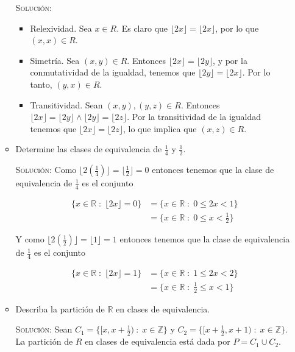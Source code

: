 \documentclass[letterpaper,11pt]{article}
\begin{document}
\begin{enumerate}
\begin{itemize}
        \textsc{Solución:}
        \begin{itemize}
            \item Relexividad. Sea $x \in R$. Es claro que $⌊2x⌋ = ⌊2x⌋$, 
            por lo que $(x, x) \in R$. 

            \item Simetría. Sea $(x, y) \in R$. Entonces $⌊2x⌋ = ⌊2y⌋$, y por 
            la conmutatividad de la igualdad, tenemos que $⌊2y⌋ = ⌊2x⌋$. Por
            lo tanto, $(y, x) \in R$. 

            \item Transitividad. Sean $(x, y), (y,z) \in R$. Entonces 
            $⌊2x⌋ = ⌊2y⌋ \land ⌊2y⌋ = ⌊2z⌋$. Por la transitividad de la 
            igualdad tenemos que $⌊2x⌋ = ⌊2z⌋$, lo que implica que 
            $(x, z) ∈ R$. 
        \end{itemize}

        \item Determine las clases de equivalencia de $\frac{1}{4}$ y 
        $\frac{1}{2}$.

        \textsc{Solución:} Como $⌊2(\frac{1}{4})⌋ = ⌊\frac{1}{2}⌋ = 0$ entonces 
        tenemos que la clase de equivalencia de $\frac{1}{4}$ es el conjunto 

        \begin{align*}
            \{ x ∈ ℝ \; : \; ⌊2x⌋ = 0\}
            &= \{x ∈ ℝ \; : \; 0 \leq 2x < 1\} \\ 
            &= \{x ∈ ℝ \; : \; 0 \leq x < \frac{1}{2}\}
        \end{align*}

        Y como $⌊2(\frac{1}{2})⌋ = ⌊1⌋ = 1$ entonces tenemos que la clase de  
        equivalencia de $\frac{1}{4}$ es el conjunto 

        \begin{align*}
            \{x ∈ ℝ \; : \; ⌊2x⌋ = 1\} 
            &= \{x ∈ ℝ \; : \; 1 \leq 2x < 2\} \\ 
            &= \{x ∈ ℝ \; : \; \frac{1}{2} \leq x < 1\}
        \end{align*}

        \item Describa la partición de $ℝ$ en clases de equivalencia.

        \textsc{Solución:} Sean $C_{1} = \{[x, x + \frac{1}{2}) \: : \; x ∈ ℤ\}$
        y $C_{2} = \{[x + \frac{1}{2}, x + 1) \; : \; x ∈ ℤ\}$. La partición de 
        $R$ en clases de equivalencia está dada por $P = C_{1} ∪ C_{2}$. 
    \end{itemize}


\end{enumerate}
\end{document}
